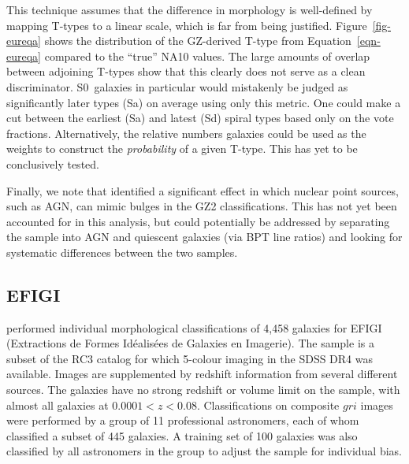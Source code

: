 \documentclass[useAMS,usenatbib]{mn2e}
\begin{document}
This technique assumes that the difference in morphology is well-defined by mapping T-types to a linear scale, which is far from being justified. Figure~\ref{fig-eureqa} shows the distribution of the GZ-derived T-type from Equation~\ref{eqn-eureqa} compared to the ``true'' NA10 values. The large amounts of overlap between adjoining T-types show that this clearly does not serve as a clean discriminator. S0~galaxies in particular would mistakenly be judged as significantly later types (Sa) on average using only this metric. One could make a cut between the earliest (Sa) and latest (Sd) spiral types based only on the vote fractions. Alternatively, the relative numbers galaxies could be used as the weights to construct the {\em probability} of a given T-type. This has yet to be conclusively tested. 

Finally, we note that \citet{sim13} identified a significant effect in which nuclear point sources, such as AGN, can mimic bulges in the GZ2 classifications. This has not yet been accounted for in this analysis, but could potentially be addressed by separating the sample into AGN and quiescent galaxies (via BPT line ratios) and looking for systematic differences between the two samples. 

%

\subsection{EFIGI}

\citet{bai11} performed individual morphological classifications of 4,458 galaxies for EFIGI (Extractions de Formes Id\'ealis\'ees de Galaxies en Imagerie). The sample is a subset of the RC3 catalog for which 5-colour imaging in the SDSS DR4 was available. Images are supplemented by redshift information from several different sources. The galaxies have no strong redshift or volume limit on the sample, with almost all galaxies at $0.0001<z<0.08$. Classifications on composite $gri$ images were performed by a group of 11 professional astronomers, each of whom classified a subset of 445 galaxies. A training set of 100 galaxies was also classified by all astronomers in the group to adjust the sample for individual bias. 
\end{document}
